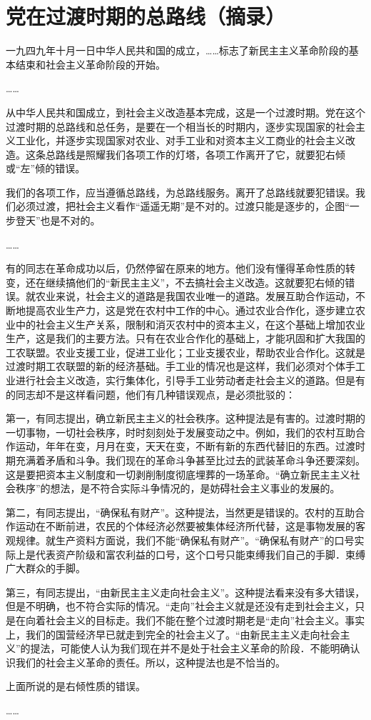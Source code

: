 \section[党在过渡时期的总路线（摘录）（一九五三年六月十五日）]{党在过渡时期的总路线（摘录）}


一九四九年十月一日中华人民共和国的成立，……标志了新民主主义革命阶段的基本结束和社会主义革命阶段的开始。

……

从中华人民共和国成立，到社会主义改造基本完成，这是一个过渡时期。党在这个过渡时期的总路线和总任务，是要在一个相当长的时期内，逐步实现国家的社会主义工业化，并逐步实现国家对农业、对手工业和对资本主义工商业的社会主义改造。这条总路线是照耀我们各项工作的灯塔，各项工作离开了它，就要犯右倾或“左”倾的错误。

我们的各项工作，应当遵循总路线，为总路线服务。离开了总路线就要犯错误。我们必须过渡，把社会主义看作“遥遥无期”是不对的。过渡只能是逐步的，企图“一步登天”也是不对的。

……

有的同志在革命成功以后，仍然停留在原来的地方。他们没有懂得革命性质的转变，还在继续搞他们的“新民主主义”，不去搞社会主义改造。这就要犯右倾的错误。就农业来说，社会主义的道路是我国农业唯一的道路。发展互助合作运动，不断地提高农业生产力，这是党在农村中工作的中心。通过农业合作化，逐步建立农业中的社会主义生产关系，限制和消灭农村中的资本主义，在这个基础上增加农业生产，这是我们的主要方法。只有在农业合作化的基础上，才能巩固和扩大我国的工农联盟。农业支援工业，促进工业化；工业支援农业，帮助农业合作化。这就是过渡时期工农联盟的新的经济基础。手工业的情况也是这样，我们必须对个体手工业进行社会主义改造，实行集体化，引导手工业劳动者走社会主义的道路。但是有的同志却不是这样看问题，他们有几种错误观点，是必须批驳的：

第一，有同志提出，确立新民主主义的社会秩序。这种提法是有害的。过渡时期的一切事物，一切社会秩序，时时刻刻处于发展变动之中。例如，我们的农村互助合作运动，年年在变，月月在变，天天在变，不断有新的东西代替旧的东西。过渡时期充满着矛盾和斗争。我们现在的革命斗争甚至比过去的武装革命斗争还要深刻。这是要把资本主义制度和一切剥削制度彻底埋葬的一场革命。“确立新民主主义社会秩序”的想法，是不符合实际斗争情况的，是妨碍社会主义事业的发展的。

第二，有同志提出，“确保私有财产”。这种提法，当然更是错误的。农村的互助合作运动在不断前进，农民的个体经济必然要被集体经济所代替，这是事物发展的客观规律。就生产资料方面说，我们不能“确保私有财产”。“确保私有财产”的口号实际上是代表资产阶级和富农利益的口号，这个口号只能束缚我们自己的手脚．束缚广大群众的手脚。

第三，有同志提出，“由新民主主义走向社会主义”。这种提法看来没有多大错误，但是不明确，也不符合实际的情况。“走向”社会主义就是还没有走到社会主义，只是在向着社会主义的目标走。我们不能在整个过渡时期老是“走向”社会主义。事实上，我们的国营经济早已就走到完全的社会主义了。“由新民主主义走向社会主义”的提法，可能使人认为我们现在并不是处于社会主义革命的阶段．不能明确认识我们的社会主义革命的责任。所以，这种提法也是不恰当的。

上面所说的是右倾性质的错误。

……


